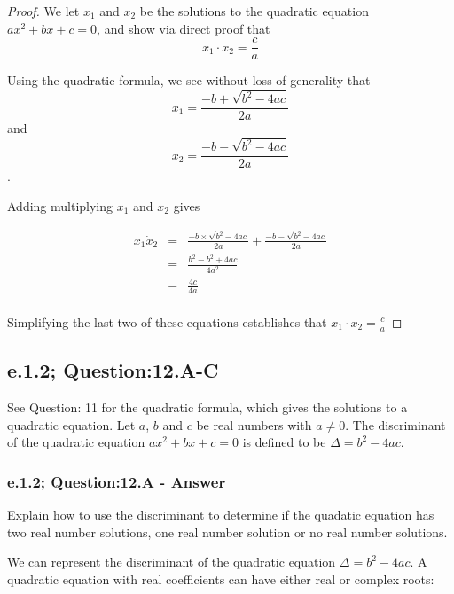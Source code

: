 \begin{proof}

We let $x_1$ and $x_2$ be the solutions to the quadratic equation $ax^2 + bx + c = 0$, and show via direct proof that \[ x_1 \cdot x_2 = \frac{c}{a} \]

Using the quadratic formula, we see without loss of generality that \[ x_1 = \frac{-b + \sqrt{b^2 -4ac}}{2a} \] and \[ x_2 = \frac{-b - \sqrt{b^2 -4ac}}{2a} \]. 

Adding multiplying $x_1$ and $x_2$ gives  

\begin{eqnarray*}
x_1 \dot x_2 & = & \frac{-b \times \sqrt{b^2 -4ac}}{2a} + \frac{-b - \sqrt{b^2 -4ac}}{2a}   \nonumber \\
& = & \frac{b^2 - b^2 + 4ac}{4a^2} \nonumber \\
& = & \frac{4c}{4a} \nonumber \\
\end{eqnarray*}

Simplifying the last two of these equations establishes that $x_1 \cdot x_2 = \frac{c}{a}$

\end{proof}




\newpage
\subsection{e.1.2; Question:12.A-C}
See Question: 11 for the quadratic formula, which gives the solutions to a quadratic equation. Let $a$, $b$ and $c$ be real numbers with $a \neq 0$. The discriminant of the quadratic equation $ax^2 + bx + c = 0$ is defined to be $\Delta = b^2 -4ac$. \\

\subsubsection*{e.1.2; Question:12.A - Answer}
Explain how to use the discriminant to determine if the quadatic equation has two real number solutions, one real number solution or no real number solutions.


We can represent the discriminant of the quadratic equation $\Delta = b^2 -4ac$. A quadratic equation with real coefficients can have either real or complex roots: 

